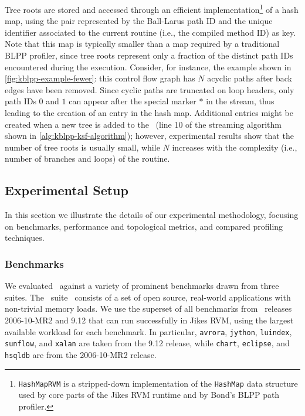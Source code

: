 \noindent Tree roots are stored and accessed through an efficient implementation\footnote{{\tt HashMapRVM} is a stripped-down implementation of the {\tt HashMap} data structure used by core parts of the Jikes RVM runtime and by Bond's BLPP path profiler.} of a hash map, using the pair represented by the Ball-Larus path ID and the unique identifier associated to the current routine (i.e., the compiled method ID) as key. Note that this map is typically smaller than a map required by a traditional BLPP profiler, since tree roots represent only a fraction of the distinct path IDs encountered during the execution. Consider, for instance, the example shown in \myfigure\ref{fig:kblpp-example-fewer}: this control flow graph has $N$ acyclic paths after back edges have been removed. Since cyclic paths are truncated on loop headers, only path IDs $0$ and $1$ can appear after the special marker $*$ in the stream, thus leading to the creation of an entry in the hash map. Additional entries might be created when a new tree is added to the \ksf\ (line 10 of the streaming algorithm shown in \myalgorithm\ref{alg:kblpp-ksf-algorithm}); however, experimental results show that the number of tree roots is usually small, while $N$ increases with the complexity (i.e., number of branches and loops) of the routine.

\subsection{Experimental Setup}

In this section we illustrate the details of our experimental methodology, focusing on benchmarks, performance and topological metrics, and compared profiling techniques.

\subsubsection*{Benchmarks}

We evaluated \kblpp\ against a variety of prominent benchmarks drawn from three suites. The \dacapo\ suite~\cite{Blackburn06} consists of a set of open source, real-world applications with non-trivial memory loads. We use the superset of all benchmarks from \dacapo\ releases 2006-10-MR2 and 9.12 that can run successfully in Jikes RVM, using the largest available workload for each benchmark. In particular, {\tt avrora}, {\tt jython}, {\tt luindex}, {\tt sunflow}, and {\tt xalan} are taken from the 9.12 release, while {\tt chart}, {\tt eclipse}, and {\tt hsqldb} are from the 2006-10-MR2 release.

